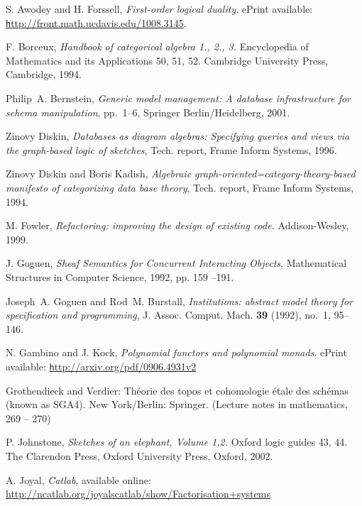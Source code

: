 \documentclass{amsart}
\theoremstyle{remark}
\theoremstyle{definition}
\begin{document}

\begin{thebibliography}{JTT}

 S. Awodey and H. Forssell, {\em First-order logical duality}.  ePrint available: \href{http://front.math.ucdavis.edu/1008.3145}{\texttt http://front.math.ucdavis.edu/1008.3145}.

 F. Borceux, {\em Handbook of categorical algebra 1., 2., 3.}  Encyclopedia of Mathematics and its Applications 50, 51, 52.  Cambridge University Press, Cambridge, 1994.

Philip~A. Bernstein, \emph{Generic model management: A database infrastructure
  for schema manipulation}, pp.~1--6, Springer Berlin/Heidelberg, 2001.
  
Zinovy Diskin, \emph{Databases as diagram algebras: Specifying queries and
  views via the graph-based logic of sketches}, Tech. report, Frame Inform
  Systems, 1996.
    
Zinovy Diskin and Boris Kadish, \emph{Algebraic
  graph-oriented=category-theory-based manifesto of categorizing data base
  theory}, Tech. report, Frame Inform Systems, 1994.
  
 M. Fowler, {\em Refactoring: improving the design of existing code.}  Addison-Wesley, 1999.



 J. Goguen, {\em Sheaf Semantics for Concurrent Interacting Objects}, Mathematical Structures in Computer Science, 1992, pp. 159 --191.
  
Joseph~A. Goguen and Rod~M. Burstall, \emph{Institutions: abstract model theory
  for specification and programming}, J. Assoc. Comput. Mach. \textbf{39}
  (1992), no.~1, 95--146.
  
 N. Gambino and J. Kock, {\em Polynomial functors and polynomial monads}.  ePrint available: \href{http://arxiv.org/pdf/0906.4931v2}{\texttt http://arxiv.org/pdf/0906.4931v2}
  
 Grothendieck and Verdier: Th\'eorie des topos et cohomologie \'{e}tale des sch\'{e}mas (known as SGA4). New York/Berlin: Springer. (Lecture notes in mathematics, 269 -- 270)

 P. Johnstone, {\em Sketches of an elephant, Volume 1,2.}  Oxford logic guides 43, 44.  The Clarendon Press, Oxford University Press, Oxford, 2002.

 A. Joyal, {\em Catlab}, available online: \href{http://ncatlab.org/joyalscatlab/show/Factorisation+systems}{http://ncatlab.org/joyalscatlab/show/Factorisation+systems}


\end{thebibliography}
\end{document}
